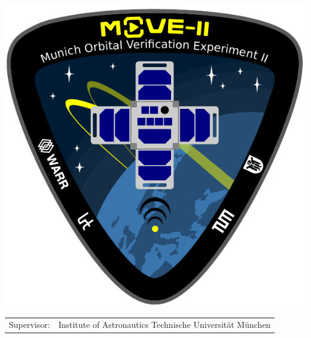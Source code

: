 \begin{titlepage}
	\vspace{60pt}	
\begin{center}
\includegraphics[scale=0.75]{resources/figs/MOVE-Logo.pdf} 	
\end{center}
	
	\begin{table}[b!]
		\begin{tabularx}{\linewidth}{p{4.2cm} X}
		Supervisor:
		&
		\supervisor\newline
		Institute of Astronautics\newline
		Technische Universität München
		\end{tabularx}
	\end{table}

\end{titlepage}
\restoregeometry
